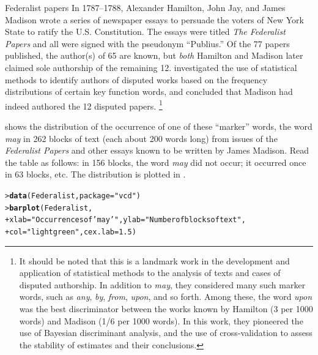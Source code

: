 \documentclass[10pt,krantz2]{krantz}\usepackage[]{graphicx}\usepackage[]{color}
\makeatletter
\newcommand{\hlnum}[1]{\textcolor[rgb]{0.686,0.059,0.569}{#1}}%
\newcommand{\hlstr}[1]{\textcolor[rgb]{0.192,0.494,0.8}{#1}}%
\newcommand{\hlstd}[1]{\textcolor[rgb]{0.345,0.345,0.345}{#1}}%
\newcommand{\hlkwc}[1]{\textcolor[rgb]{0.333,0.667,0.333}{#1}}%
\newcommand{\hlkwd}[1]{\textcolor[rgb]{0.737,0.353,0.396}{\textbf{#1}}}%
\newenvironment{kframe}{%
 \def\at@end@of@kframe{}%
 \ifinner\ifhmode%
  \def\at@end@of@kframe{\end{minipage}}%
  \begin{minipage}{\columnwidth}%
 \fi\fi%
 \def\FrameCommand##1{\hskip\@totalleftmargin \hskip-\fboxsep
 \colorbox{shadecolor}{##1}\hskip-\fboxsep
     \hskip-\linewidth \hskip-\@totalleftmargin \hskip\columnwidth}%
 \MakeFramed {\advance\hsize-\width
   \@totalleftmargin\z@ \linewidth\hsize
   \@setminipage}}%
 {\par\unskip\endMakeFramed%
 \at@end@of@kframe}
\newenvironment{knitrout}{}{} %
\renewenvironment{knitrout}{\small\renewcommand{\baselinestretch}{.85}}{} %
\makeatother
\begin{document}
\begin{Example}[madison1]{Federalist papers}
In 1787--1788, Alexander Hamilton, John Jay, and James Madison
wrote a series of newspaper essays to persuade the voters of
New York State to ratify the U.S. Constitution.
The essays were titled \emph{The Federalist Papers}
and all were signed with the pseudonym ``Publius.''  Of the 77 papers published,
the author(s) of 65 are known, but \emph{both}
Hamilton and Madison later claimed sole authorship of the remaining 12.
\citet{MostellerWallace:63,MostellerWallace:84}
investigated the use of statistical methods to identify authors of
disputed works based on the frequency distributions of certain key
function words, and concluded that Madison had indeed authored the
12 disputed papers.%
\footnote{
It should be noted that this is a landmark work in the development and
application of statistical methods to the analysis of texts and
cases of disputed authorship. In addition to
\emph{may}, they considered many such marker words,
such as \emph{any}, \emph{by}, \emph{from}, \emph{upon}, and so forth.
Among these, the word \emph{upon} was the best discriminator between
the works known by Hamilton (3 per 1000 words) and Madison (1/6 per 1000 words).
In this work, they pioneered the use of Bayesian discriminant analysis,
and the use of cross-validation to assess the stability of estimates
and their conclusions.
}

 shows the distribution of the occurrence of one of
these ``marker'' words,
the
word \emph{may} in 262 blocks of text (each about 200 words long)
from issues of the \emph{Federalist Papers} and other essays known
to be written by James Madison.  Read the table as follows:
in 156 blocks, the word \emph{may}
did not occur; it occurred once in 63 blocks, etc.  The distribution
is plotted in .


\begin{knitrout}
\color{fgcolor}\begin{kframe}
\begin{alltt}
\hlstd{> }\hlkwd{data}\hlstd{(Federalist,} \hlkwc{package} \hlstd{=} \hlstr{"vcd"}\hlstd{)}
\hlstd{> }\hlkwd{barplot}\hlstd{(Federalist,}
\hlstd{+ }        \hlkwc{xlab} \hlstd{=} \hlstr{"Occurrences of 'may'"}\hlstd{,} \hlkwc{ylab} \hlstd{=} \hlstr{"Number of blocks of text"}\hlstd{,}
\hlstd{+ }        \hlkwc{col} \hlstd{=} \hlstr{"lightgreen"}\hlstd{,} \hlkwc{cex.lab} \hlstd{=} \hlnum{1.5}\hlstd{)}
\end{alltt}
\end{kframe}\begin{figure}[!htbp]


\end{figure}
\end{knitrout}
\end{Example}
\end{document}
